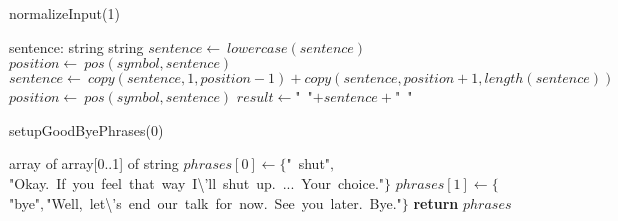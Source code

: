\documentclass[a4paper,10pt]{article}
\begin{document}
\begin{algorithm}
\caption{normalizeInput(1)}
\begin{algorithmic}[5]
\State {}
\State {}
\State {}
    \State sentence: string
  \EndDecl
    \State string
  \EndDecl
  \State \(sentence\gets\ lowercase(sentence)\)
    \State \(position\gets\ pos(symbol,sentence)\)
      \State \(sentence\gets\ copy(sentence,1,position-1)+copy(sentence,position+1,length(sentence))\)
      \State \(position\gets\ pos(symbol,sentence)\)
    \EndWhile
  \EndFor
  \State \(result\gets\)"{}\ "{}\(+sentence+\)"{}\ "{}\(\)
\EndFunction
\end{algorithmic}
\end{algorithm}


\begin{algorithm}
\caption{setupGoodByePhrases(0)}
\begin{algorithmic}[5]
    \State array of array[0..1] of string
  \EndDecl
  \State \(phrases[0]\gets\{\)"{}\ shut"{}\(,\)"{}Okay.\ If\ you\ feel\ that\ way\ I\textbackslash{}'{}ll\ shut\ up.\ ...\ Your\ choice."{}\(\}\)
  \State \(phrases[1]\gets\{\)"{}bye"{}\(,\)"{}Well,\ let\textbackslash{}'{}s\ end\ our\ talk\ for\ now.\ See\ you\ later.\ Bye."{}\(\}\)
  \State \textbf{return} \(phrases\)
\EndFunction
\end{algorithmic}
\end{algorithm}
\end{document}

